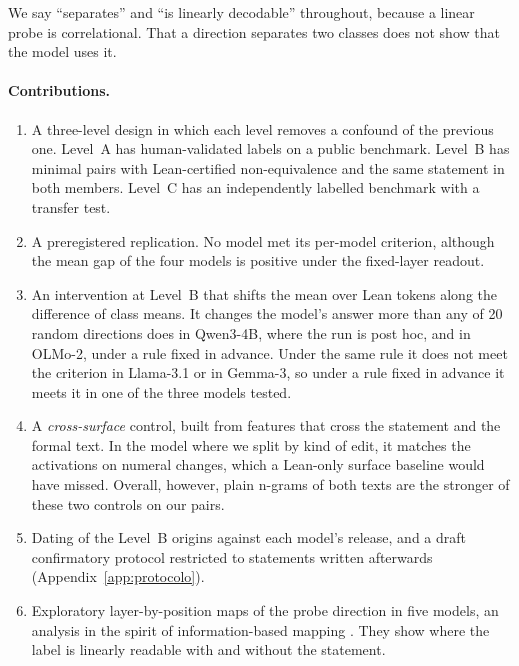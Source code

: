 \documentclass[10pt]{article}
\begin{document}
We say ``separates'' and ``is linearly decodable'' throughout, because a linear probe is correlational. That a
direction separates two classes does not show that the model uses it.

\paragraph{Contributions.}
\begin{enumerate}
\item A three-level design in which each level removes a confound of the previous one. Level~A has human-validated
labels on a public benchmark. Level~B has minimal pairs with Lean-certified non-equivalence and the same statement
in both members. Level~C has an independently labelled benchmark with a transfer test.
\item A preregistered replication. No model met its per-model criterion, although the mean gap of the four models
is positive under the fixed-layer readout.
\item An intervention at Level~B that shifts the mean over Lean tokens along the difference of class means. It changes
the model's answer more than any of 20 random directions does in Qwen3-4B, where the run is post hoc, and in OLMo-2, under a rule
fixed in advance. Under the same rule it does not meet the criterion in Llama-3.1 or in Gemma-3, so under a rule
fixed in advance it meets it in one of the three models tested.
\item A \emph{cross-surface} control, built from features that cross the statement and the formal text. In the
model where we split by kind of edit, it matches the activations on numeral changes, which a Lean-only surface
baseline would have missed. Overall, however, plain n-grams of both texts are the stronger of these two controls on our pairs.
\item Dating of the Level~B origins against each model's release, and a draft confirmatory protocol restricted to
statements written afterwards (Appendix~\ref{app:protocolo}).
\item Exploratory layer-by-position maps of the probe direction in five models, an analysis in the spirit of
information-based mapping \citep{searchlight}. They show where the label is linearly readable with and without the
statement.
\end{enumerate}
\end{document}
